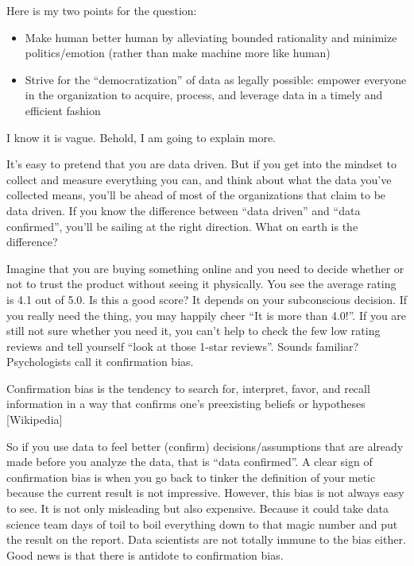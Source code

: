 \documentclass[12pt,]{krantz}
\providecommand{\tightlist}{%
  \setlength{\itemsep}{0pt}\setlength{\parskip}{0pt}}
\renewenvironment{quote}{\begin{VF}}{\end{VF}}
\begin{document}
Here is my two points for the question:

\begin{itemize}
\tightlist
\item
  Make human better human by alleviating bounded rationality and minimize politics/emotion (rather than make machine more like human)
\item
  Strive for the ``democratization'' of data as legally possible: empower everyone in the organization to acquire, process, and leverage data in a timely and efficient fashion
\end{itemize}

I know it is vague. Behold, I am going to explain more.

It's easy to pretend that you are data driven. But if you get into the mindset to collect and measure everything you can, and think about what the data you've collected means, you'll be ahead of most of the organizations that claim to be data driven. If you know the difference between ``data driven'' and ``data confirmed'', you'll be sailing at the right direction. What on earth is the difference?

Imagine that you are buying something online and you need to decide whether or not to trust the product without seeing it physically. You see the average rating is 4.1 out of 5.0. Is this a good score? It depends on your subconscious decision. If you really need the thing, you may happily cheer ``It is more than 4.0!''. If you are still not sure whether you need it, you can't help to check the few low rating reviews and tell yourself ``look at those 1-star reviews''. Sounds familiar? Psychologists call it confirmation bias.

\begin{quote}
Confirmation bias is the tendency to search for, interpret, favor, and recall information in a way that confirms one's preexisting beliefs or hypotheses {[}Wikipedia{]}
\end{quote}

So if you use data to feel better (confirm) decisions/assumptions that are already made before you analyze the data, that is ``data confirmed''. A clear sign of confirmation bias is when you go back to tinker the definition of your metic because the current result is not impressive. However, this bias is not always easy to see. It is not only misleading but also expensive. Because it could take data science team days of toil to boil everything down to that magic number and put the result on the report. Data scientists are not totally immune to the bias either. Good news is that there is antidote to confirmation bias.
\end{document}
